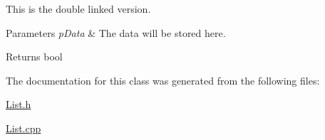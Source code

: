 This is the double linked version.


\begin{DoxyParams}{Parameters}
{\em p\+Data} & The data will be stored here. \\
\hline
\end{DoxyParams}
\begin{DoxyReturn}{Returns}
bool 
\end{DoxyReturn}


The documentation for this class was generated from the following files\+:\begin{DoxyCompactItemize}
\item 
\hyperlink{_list_8h}{List.\+h}\item 
\hyperlink{_list_8cpp}{List.\+cpp}\end{DoxyCompactItemize}
